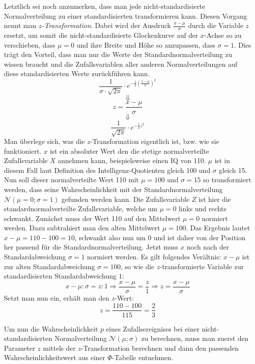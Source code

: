\pagebreak


Letztlich sei noch anzumerken, dass man jede nicht-standardisierte Normalverteilung zu einer standardisierten transformieren kann. Diesen Vorgang nennt man \emph{$z$-Transformation}. Dabei wird der Ausdruck $\frac{x - \mu}{\sigma}$ durch die Variable $z$ ersetzt, um somit die nicht-standardisierte Glockenkurve auf der $x$-Achse so zu verschieben, dass $\mu = 0$ und ihre Breite und H\"{o}he so anzupassen, dass $\sigma = 1$. Dies tr\"{a}gt den Vorteil, dass man nur die Werte der Standardnormalverteilung zu wissen braucht und die Zufallsvariablen aller anderen Normalverteilungen auf diese standardisierten Werte zur\"{u}ckf\"{u}hren kann. $$\frac{1}{\sigma \cdot \sqrt{2\pi}} \cdot e^{-\frac{1}{2}\left(\frac{x - \mu}{\sigma}\right)^2}$$ $$\Downarrow$$ $$z = \frac{x - \mu}{\sigma} $$ $$\Downarrow$$ $$\frac{1}{\sqrt{2\pi}} \cdot e^{-\frac{1}{2} z^2}$$ Man \"{u}berlege sich, was die $z$-Transformation eigentlich ist, bzw. wie sie funktioniert. $x$ ist ein absoluter Wert den die stetige normalverteilte Zufallsvariable $X$ annehmen kann, beispielsweise einen IQ von 110. $\mu$ ist in diesem Fall laut Definition des Intelligenz-Quotienten gleich 100 und $\sigma$ gleich 15. Nun soll dieser normalverteilte Wert 110 mit $\mu=100$ und $\sigma=15$ so transformiert werden, dass seine Wahrscheinlichkeit mit der Standardnormalverteilung $\mathcal{N}(\mu=0;\sigma=1)$ gefunden werden kann. Die Zufallsvariable $Z$ ist hier die standardnormalverteilte Zufallsvariable, welche um $\mu=0$ links und rechts schwankt. Zun\"{a}chst muss der Wert 110 auf den Mittelwert $\mu=0$ normiert werden. Dazu subtrahiert man den alten Mittelwert $\mu=100$. Das Ergebnis lautet $x - \mu = 110 - 100 = 10$, schwankt also nun um 0 und ist daher von der Position her passend f\"{u}r die Standardnormalverteilung. Jetzt muss $x$ noch nach der Standardabweichung $\sigma = 1$ normiert werden. Es gilt folgendes Ver\"{a}ltnis: $x - \mu$ ist zur alten Standardabweichung $\sigma = 100$, so wie die $z$-transformierte Variable zur standardisierten Standardabweichung $1$: $$x - \mu : \sigma = z : 1 \Rightarrow \frac{x-\mu}{\sigma} = \frac{z}{1} \Rightarrow z = \frac{x-\mu}{\sigma}$$ Setzt man nun ein, erh\"{a}lt man den $z$-Wert: $$z = \frac{110 - 100}{115} = \frac{2}{3}$$ 

\pagebreak


Um nun die Wahrscheinlichkeit $p$ eines Zufallsereignises bei einer nicht-standardisierten Normalverteilung $\mathcal{N}(\mu; \sigma)$ zu berechnen, muss man zuerst den Parameter $z$ mittels der $z$-Transformation berechnen und dann den passenden Wahrscheinlichkeitswert aus einer $\Phi$-Tabelle entnehmen.

